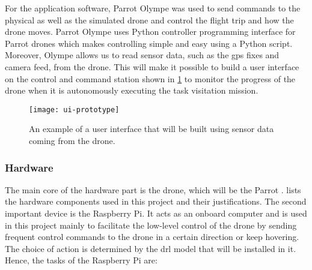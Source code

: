 \documentclass[../main.tex]{subfiles}
\begin{document}
For the application software, Parrot Olympe 
was used to send commands to the physical as well as 
the simulated drone and control the flight trip and 
how the drone moves. Parrot Olympe uses Python 
controller programming interface for Parrot drones 
which makes controlling simple and easy using a 
Python script. Moreover, Olympe allows us to read
sensor data, such as the \gls{gps} fixes and camera feed, 
from the \anafi
drone. This will make it possible to build a user interface
on the control and command station
shown in \cref{fig:ui-prototype} to monitor 
the progress of the drone
when it is autonomously executing the task visitation
mission.

\begin{figure}[tbp]
    \centering
    \texttt{[image: ui-prototype]}
    \caption{An example of a user interface that will be built
                using sensor data coming from the \anafi drone.}
    \label{fig:ui-prototype}
\end{figure}

\subsubsection{Hardware}

The main core of the hardware part is the drone, 
which will be the Parrot \anafi.
 lists the hardware components
used in this project and their justifications. 
The second important device is the Raspberry Pi. It
acts as an onboard computer and is used in this project
mainly to facilitate the low-level control of the drone
by sending frequent control commands to the drone
in a certain direction or keep hovering.
The choice of action is determined by the \gls{drl}
model that will be installed in it.
Hence, the tasks of the Raspberry Pi are:
\end{document}
